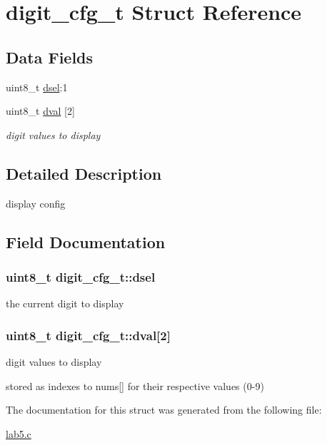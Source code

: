 \hypertarget{structdigit__cfg__t}{\section{digit\+\_\+cfg\+\_\+t Struct Reference}
\label{structdigit__cfg__t}
}
\subsection*{Data Fields}
\begin{DoxyCompactItemize}
\item 
uint8\+\_\+t \hyperlink{structdigit__cfg__t_a7c7de4ec6ad446a8507e79cac4e09199}{dsel}\+:1
\item 
uint8\+\_\+t \hyperlink{structdigit__cfg__t_a4091aa08a566861dd4b3bd5354513175}{dval} \mbox{[}2\mbox{]}
\begin{DoxyCompactList}\small\item\em digit values to display \end{DoxyCompactList}\end{DoxyCompactItemize}


\subsection{Detailed Description}
display config 

\subsection{Field Documentation}
\hypertarget{structdigit__cfg__t_a7c7de4ec6ad446a8507e79cac4e09199}{
\subsubsection[{dsel}]{\setlength{\rightskip}{0pt plus 5cm}uint8\+\_\+t digit\+\_\+cfg\+\_\+t\+::dsel}}\label{structdigit__cfg__t_a7c7de4ec6ad446a8507e79cac4e09199}
the current digit to display \hypertarget{structdigit__cfg__t_a4091aa08a566861dd4b3bd5354513175}{
\subsubsection[{dval}]{\setlength{\rightskip}{0pt plus 5cm}uint8\+\_\+t digit\+\_\+cfg\+\_\+t\+::dval\mbox{[}2\mbox{]}}}\label{structdigit__cfg__t_a4091aa08a566861dd4b3bd5354513175}


digit values to display 

stored as indexes to nums\mbox{[}\mbox{]} for their respective values (0-\/9) 

The documentation for this struct was generated from the following file\+:\begin{DoxyCompactItemize}
\item 
\hyperlink{lab5_8c}{lab5.\+c}\end{DoxyCompactItemize}
